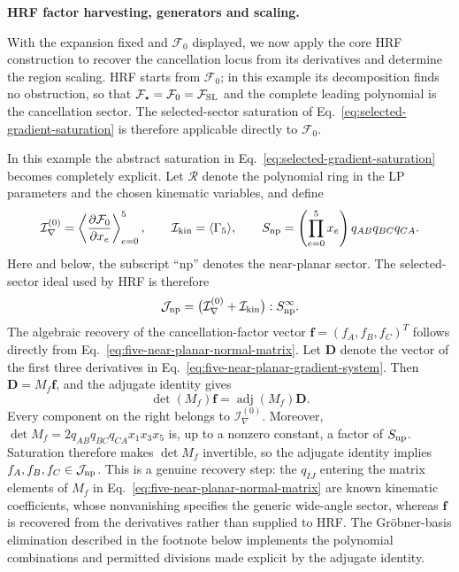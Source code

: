 \documentclass[a4paper,11pt]{article}
\newcommand{\FSL}{\mathcal F_{\rm SL}}
\begin{document}
\medskip
\noindent\textbf{HRF factor harvesting, generators and scaling.}\par\smallskip

With the expansion fixed and \(\mathcal F_0\) displayed, we now apply the
core HRF construction to recover the cancellation locus from its derivatives
and determine the region scaling.  HRF starts from \(\mathcal F_0\); in this
example its decomposition finds no obstruction, so that
\(\mathcal F_\star=\mathcal F_0=\FSL\) and the complete leading polynomial is
the cancellation sector.  The selected-sector saturation of
Eq.~\eqref{eq:selected-gradient-saturation} is therefore applicable directly
to \(\mathcal F_0\).

In this example the abstract saturation in
Eq.~\eqref{eq:selected-gradient-saturation} becomes completely explicit.
Let \(\mathcal R\) denote the polynomial ring in the LP parameters and
the chosen kinematic variables, and define
\begin{equation}
 \mathcal I_\nabla^{(0)}
 =\left\langle\frac{\partial\mathcal F_0}{\partial x_e}
  \right\rangle_{e=0}^{5},\qquad
 \mathcal I_{\rm kin}=\langle\Gamma_5\rangle,\qquad
 S_{\rm np}=\left(\prod_{e=0}^{5}x_e\right)
 q_{AB}q_{BC}q_{CA}.
 \label{eq:five-near-planar-saturation-data}
\end{equation}
Here and below, the subscript ``np'' denotes the near-planar sector.
The selected-sector ideal used by HRF is therefore
\begin{equation}
 \mathcal J_{\rm np}
 =\bigl(\mathcal I_\nabla^{(0)}+\mathcal I_{\rm kin}\bigr)
 :S_{\rm np}^{\infty}.
 \label{eq:five-near-planar-saturated-ideal}
\end{equation}
The algebraic recovery of the cancellation-factor vector
\(\boldsymbol f=(f_A,f_B,f_C)^T\) follows directly from
Eq.~\eqref{eq:five-near-planar-normal-matrix}.  Let \(\boldsymbol D\) denote
the vector of the first three derivatives in
Eq.~\eqref{eq:five-near-planar-gradient-system}.  Then
\(\boldsymbol D=M_f\boldsymbol f\), and the adjugate identity gives
\[
 \det(M_f)\boldsymbol f
 =\operatorname{adj}(M_f)\boldsymbol D.
\]
Every component on the right belongs to \(\mathcal I_\nabla^{(0)}\).
Moreover,
\(\det M_f=2q_{AB}q_{BC}q_{CA}x_1x_3x_5\) is, up to a nonzero constant,
a factor of \(S_{\rm np}\).  Saturation therefore makes \(\det M_f\)
invertible, so the adjugate identity implies
\(f_A,f_B,f_C\in\mathcal J_{\rm np}\).  This is a genuine recovery step:
the \(q_{IJ}\) entering the matrix elements of \(M_f\) in
Eq.~\eqref{eq:five-near-planar-normal-matrix} are known kinematic
coefficients, whose nonvanishing specifies the generic wide-angle sector,
whereas \(\boldsymbol f\) is recovered from the derivatives rather than
supplied to HRF.  The Gr\"obner-basis elimination described in the footnote
below implements the polynomial combinations and permitted divisions made
explicit by the adjugate identity.
\end{document}
